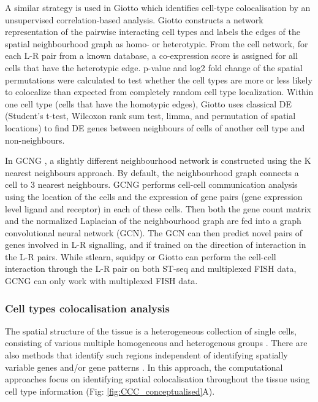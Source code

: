 A similar strategy is used in Giotto \cite{dries2021giotto} which identifies cell-type colocalisation by an unsupervised correlation-based analysis. Giotto constructs a network representation of the pairwise interacting cell types and labels the edges of the spatial neighbourhood graph as homo- or heterotypic. From the cell network, for each L-R pair from a known database, a co-expression score is assigned for all cells that have the heterotypic edge. p-value and log2 fold change of the spatial permutations were calculated to test whether the cell types are more or less likely to colocalize than expected from completely random cell type localization. Within one cell type (cells that have the homotypic edges), Giotto uses classical DE (Student’s t-test, Wilcoxon rank sum test, limma, and permutation of spatial locations) to find DE genes between neighbours of cells of another cell type and non-neighbours.

In GCNG \cite{yuan2020gcng}, a slightly different neighbourhood network is constructed using the K nearest neighbours approach. By default, the neighbourhood graph connects a cell to 3 nearest neighbours. GCNG performs cell-cell communication analysis using the location of the cells and the expression of gene pairs (gene expression level ligand and receptor) in each of these cells. Then both the gene count matrix and the normalized Laplacian of the neighbourhood graph are fed into a graph convolutional neural network (GCN). The GCN can then predict novel pairs of genes involved in L-R signalling, and if trained on the direction of interaction in the L-R pairs. While stlearn, squidpy or Giotto can perform the cell-cell interaction through the L-R pair on both ST-seq and multiplexed FISH data, GCNG can only work with multiplexed FISH data. 

\subsubsection{Cell types colocalisation analysis}
The spatial structure of the tissue is a heterogeneous collection of single cells, consisting of various multiple homogeneous and heterogenous groups \cite{schurch2020coordinated}. There are also methods that identify such regions independent of identifying spatially variable genes and/or gene patterns \cite{moses2022museum}. In this approach, the computational approaches focus on identifying spatial colocalisation throughout the tissue using cell type information (Fig: \ref{fig:CCC_conceptualised}A). 

